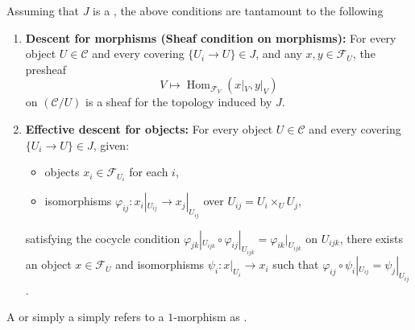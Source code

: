 \begin{definition}
\begin{enumerate}
\end{enumerate}
Assuming that $J$ is  a , the above conditions are tantamount to the following
\begin{enumerate}
    \item \textbf{Descent for morphisms (Sheaf condition on morphisms):} For every object $U \in \mathcal{C}$ and every covering $\{U_i \to U\} \in J$, and any $x, y \in \mathcal{F}_U$,
    the presheaf 
    \[
        V \mapsto \operatorname{Hom}_{\mathcal{F}_V}(x|_V, y|_V)
    \]
    on $(\mathcal{C}/U)$ is a sheaf for the topology induced by $J$.
    \item \textbf{Effective descent for objects:} For every object $U \in \mathcal{C}$ and every covering $\{U_i \to U\} \in J$, given:
    \begin{itemize}
        \item objects $x_i \in \mathcal{F}_{U_i}$ for each $i$,
        \item isomorphisms $\varphi_{ij}: x_i|_{U_{ij}} \to x_j|_{U_{ij}}$ over $U_{ij} = U_i \times_U U_j$,
    \end{itemize}
    satisfying the cocycle condition $\varphi_{jk}|_{U_{ijk}} \circ \varphi_{ij}|_{U_{ijk}} = \varphi_{ik}|_{U_{ijk}}$ on $U_{ijk}$,
    there exists an object $x \in \mathcal{F}_U$ and isomorphisms $\psi_i: x|_{U_i} \to x_i$ such that $\varphi_{ij} \circ \psi_i|_{U_{ij}} = \psi_j|_{U_{ij}}$.
\end{enumerate}

A  or simply a  simply refers to a $1$-morphism as .
\end{definition}